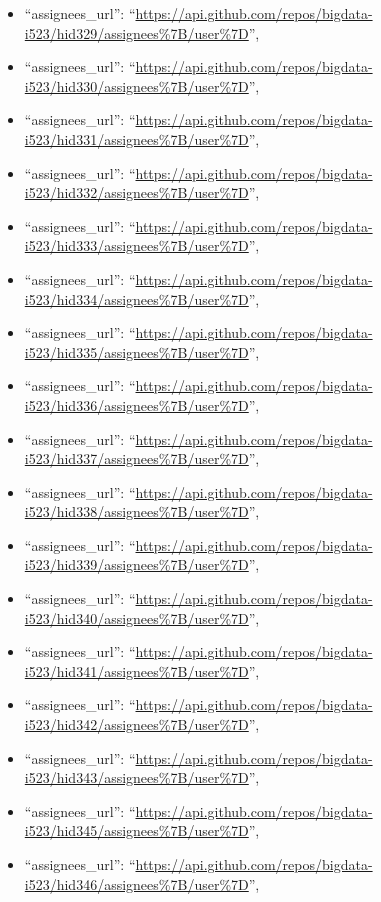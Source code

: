 \begin{itemize}
\item
  ``assignees\_url'':
  ``\url{https://api.github.com/repos/bigdata-i523/hid329/assignees\%7B/user\%7D}'',
\item
  ``assignees\_url'':
  ``\url{https://api.github.com/repos/bigdata-i523/hid330/assignees\%7B/user\%7D}'',
\item
  ``assignees\_url'':
  ``\url{https://api.github.com/repos/bigdata-i523/hid331/assignees\%7B/user\%7D}'',
\item
  ``assignees\_url'':
  ``\url{https://api.github.com/repos/bigdata-i523/hid332/assignees\%7B/user\%7D}'',
\item
  ``assignees\_url'':
  ``\url{https://api.github.com/repos/bigdata-i523/hid333/assignees\%7B/user\%7D}'',
\item
  ``assignees\_url'':
  ``\url{https://api.github.com/repos/bigdata-i523/hid334/assignees\%7B/user\%7D}'',
\item
  ``assignees\_url'':
  ``\url{https://api.github.com/repos/bigdata-i523/hid335/assignees\%7B/user\%7D}'',
\item
  ``assignees\_url'':
  ``\url{https://api.github.com/repos/bigdata-i523/hid336/assignees\%7B/user\%7D}'',
\item
  ``assignees\_url'':
  ``\url{https://api.github.com/repos/bigdata-i523/hid337/assignees\%7B/user\%7D}'',
\item
  ``assignees\_url'':
  ``\url{https://api.github.com/repos/bigdata-i523/hid338/assignees\%7B/user\%7D}'',
\item
  ``assignees\_url'':
  ``\url{https://api.github.com/repos/bigdata-i523/hid339/assignees\%7B/user\%7D}'',
\item
  ``assignees\_url'':
  ``\url{https://api.github.com/repos/bigdata-i523/hid340/assignees\%7B/user\%7D}'',
\item
  ``assignees\_url'':
  ``\url{https://api.github.com/repos/bigdata-i523/hid341/assignees\%7B/user\%7D}'',
\item
  ``assignees\_url'':
  ``\url{https://api.github.com/repos/bigdata-i523/hid342/assignees\%7B/user\%7D}'',
\item
  ``assignees\_url'':
  ``\url{https://api.github.com/repos/bigdata-i523/hid343/assignees\%7B/user\%7D}'',
\item
  ``assignees\_url'':
  ``\url{https://api.github.com/repos/bigdata-i523/hid345/assignees\%7B/user\%7D}'',
\item
  ``assignees\_url'':
  ``\url{https://api.github.com/repos/bigdata-i523/hid346/assignees\%7B/user\%7D}'',

\end{itemize}
